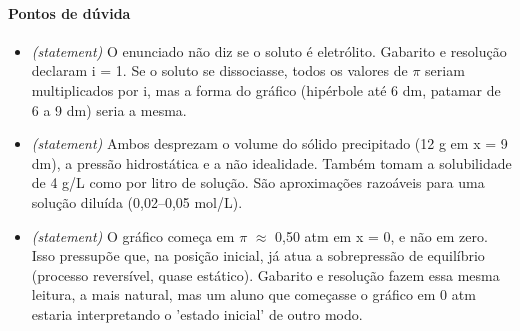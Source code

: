 \documentclass{article}%
\begin{document}
\paragraph{Pontos de dúvida}%
\begin{itemize}%
\item%
\textit{(statement)} O enunciado não diz se o soluto é eletrólito. Gabarito e resolução declaram i = 1. Se o soluto se dissociasse, todos os valores de $\pi$ seriam multiplicados por i, mas a forma do gráfico (hipérbole até 6 dm, patamar de 6 a 9 dm) seria a mesma.%
\item%
\textit{(statement)} Ambos desprezam o volume do sólido precipitado (12 g em x = 9 dm), a pressão hidrostática e a não idealidade. Também tomam a solubilidade de 4 g/L como por litro de solução. São aproximações razoáveis para uma solução diluída (0,02--0,05 mol/L).%
\item%
\textit{(statement)} O gráfico começa em $\pi$ $\approx$ 0,50 atm em x = 0, e não em zero. Isso pressupõe que, na posição inicial, já atua a sobrepressão de equilíbrio (processo reversível, quase estático). Gabarito e resolução fazem essa mesma leitura, a mais natural, mas um aluno que começasse o gráfico em 0 atm estaria interpretando o 'estado inicial' de outro modo.%
\end{itemize}%
\end{document}
